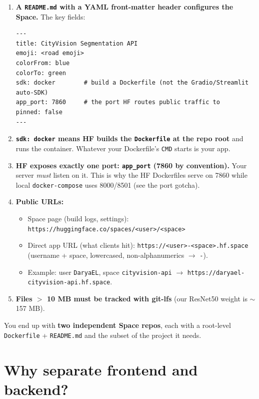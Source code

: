 \documentclass[11pt]{article}
\newcommand{\code}[1]{\lstinline[basicstyle=\ttfamily\normalsize]|#1|}
\newcommand{\rarr}{$\rightarrow$}
\begin{document}
\begin{enumerate}
  \item \textbf{A \code{README.md} with a YAML front-matter header configures the
    Space.} The key fields:
\begin{lstlisting}[style=block]
---
title: CityVision Segmentation API
emoji: <road emoji>
colorFrom: blue
colorTo: green
sdk: docker        # build a Dockerfile (not the Gradio/Streamlit auto-SDK)
app_port: 7860     # the port HF routes public traffic to
pinned: false
---
\end{lstlisting}
  \item \textbf{\code{sdk: docker} means HF builds the \code{Dockerfile} at the repo
    root} and runs the container. Whatever your Dockerfile's \code{CMD} starts is
    your app.
  \item \textbf{HF exposes exactly one port: \code{app_port} (7860 by convention).}
    Your server \emph{must} listen on it. This is why the HF Dockerfiles serve on
    7860 while local \code{docker-compose} uses 8000/8501 (see the port gotcha).
  \item \textbf{Public URLs:}
    \begin{itemize}
      \item Space page (build logs, settings):
        \code{https://huggingface.co/spaces/<user>/<space>}
      \item Direct app URL (what clients hit): \code{https://<user>-<space>.hf.space}
        (username + space, lowercased, non-alphanumerics \rarr{} \code{-}).
      \item Example: user \code{DaryaEL}, space \code{cityvision-api} \rarr{}
        \code{https://daryael-cityvision-api.hf.space}.
    \end{itemize}
  \item \textbf{Files $>$ 10 MB must be tracked with git-lfs} (our ResNet50 weight is
    $\sim$157 MB).
\end{enumerate}

You end up with \textbf{two independent Space repos}, each with a root-level
\code{Dockerfile} + \code{README.md} and the subset of the project it needs.

\section{Why separate frontend and backend?}
\end{document}
